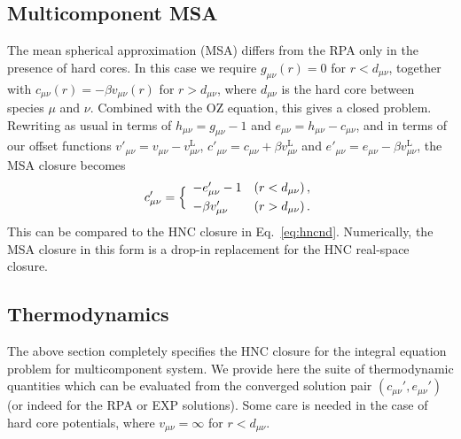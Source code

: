\documentclass[12pt,a4paper]{article}
\newcommand{\lr}{^{\mathrm{L}}}
\newcommand{\Eqref}[1]{Eq.~\eqref{#1}}
\begin{document}
\subsection{Multicomponent MSA}
%
The mean spherical approximation (MSA) differs from the RPA only in
the presence of hard cores.  In this case we require $g_{\mu\nu}(r)=0$
for $r<d_{\mu\nu}$, together with $c_{\mu\nu}(r)= -\beta
v_{\mu\nu}(r)$ for $r>d_{\mu\nu}$, where $d_{\mu\nu}$ is the hard core
between species $\mu$ and $\nu$.  Combined with the OZ equation, this
gives a closed problem.  Rewriting as usual in terms of
$h_{\mu\nu}=g_{\mu\nu}-1$ and $e_{\mu\nu}=h_{\mu\nu}-c_{\mu\nu}$, and
in terms of our offset functions
$v'_{\mu\nu}=v_{\mu\nu}-v\lr_{\mu\nu}$, $c'_{\mu\nu}=c_{\mu\nu}+\beta
v\lr_{\mu\nu}$ and $e'_{\mu\nu}=e_{\mu\nu}-\beta v\lr_{\mu\nu}$, the
MSA closure becomes
%
\begin{equation}
  c'_{\mu\nu}=\Bigl\{\begin{array}{ll}
  -e'_{\mu\nu}-1 & (r<d_{\mu\nu})\,,\\[3pt]
  -\beta v'_{\mu\nu} & (r>d_{\mu\nu})\,.
  \end{array}
\end{equation}
%
This can be compared to the HNC closure in \Eqref{eq:hncnd}.
Numerically, the MSA closure in this form is a drop-in replacement for
the HNC real-space closure.
  
\subsection{Thermodynamics}
\label{sec:thermo}
%
The above section completely specifies the HNC closure for the
integral equation problem for multicomponent system.  We provide here
the suite of thermodynamic quantities which can be evaluated from the
converged solution pair $(c_{\mu\nu}', e_{\mu\nu}')$ (or indeed for
the RPA or EXP solutions).  Some care is needed in the case of hard
core potentials, where $v_{\mu\nu}=\infty$ for $r<d_{\mu\nu}$.
\end{document}
